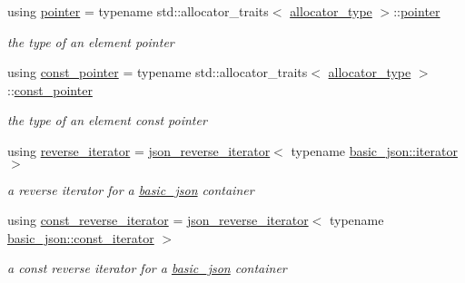 \begin{DoxyCompactItemize}
using \hyperlink{classnlohmann_1_1basic__json_a9d1b58099dc64695fcf2847ab0b2a7c7}{pointer} = typename std\-::allocator\-\_\-traits$<$ \hyperlink{classnlohmann_1_1basic__json_aa44ce84b9ac506b905b8fb56c9a0989d}{allocator\-\_\-type} $>$\-::\hyperlink{classnlohmann_1_1basic__json_a9d1b58099dc64695fcf2847ab0b2a7c7}{pointer}
\begin{DoxyCompactList}\small\item\em the type of an element pointer \end{DoxyCompactList}\item 
using \hyperlink{classnlohmann_1_1basic__json_a06efb200b69942eacd1ea22d0f6ccebb}{const\-\_\-pointer} = typename std\-::allocator\-\_\-traits$<$ \hyperlink{classnlohmann_1_1basic__json_aa44ce84b9ac506b905b8fb56c9a0989d}{allocator\-\_\-type} $>$\-::\hyperlink{classnlohmann_1_1basic__json_a06efb200b69942eacd1ea22d0f6ccebb}{const\-\_\-pointer}
\begin{DoxyCompactList}\small\item\em the type of an element const pointer \end{DoxyCompactList}\item 
using \hyperlink{classnlohmann_1_1basic__json_a2f1f83aa187a56dc5ec7a7027065ac8a}{reverse\-\_\-iterator} = \hyperlink{classnlohmann_1_1basic__json_1_1json__reverse__iterator}{json\-\_\-reverse\-\_\-iterator}$<$ typename \hyperlink{classnlohmann_1_1basic__json_1_1iterator}{basic\-\_\-json\-::iterator} $>$
\begin{DoxyCompactList}\small\item\em a reverse iterator for a \hyperlink{classnlohmann_1_1basic__json}{basic\-\_\-json} container \end{DoxyCompactList}\item 
using \hyperlink{classnlohmann_1_1basic__json_ae336fff01f4b78e3e16e5008dc8dbc00}{const\-\_\-reverse\-\_\-iterator} = \hyperlink{classnlohmann_1_1basic__json_1_1json__reverse__iterator}{json\-\_\-reverse\-\_\-iterator}$<$ typename \hyperlink{classnlohmann_1_1basic__json_1_1const__iterator}{basic\-\_\-json\-::const\-\_\-iterator} $>$
\begin{DoxyCompactList}\small\item\em a const reverse iterator for a \hyperlink{classnlohmann_1_1basic__json}{basic\-\_\-json} container \end{DoxyCompactList}\end{DoxyCompactItemize}
